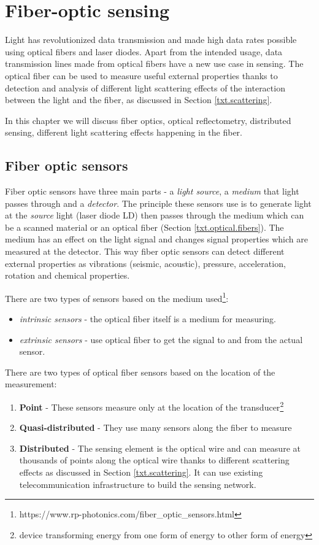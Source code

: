 \chapter{Fiber-optic sensing}\label{txt.sensing}

Light has revolutionized data transmission and made high data rates possible using optical fibers and laser diodes. Apart from the intended usage, data transmission lines made from optical fibers have a new use case in sensing. The optical fiber can be used to measure useful external properties thanks to detection and analysis of different light scattering effects of the interaction between the light and the fiber, as discussed in Section \ref{txt.scattering}.

In this chapter we will discuss fiber optics, optical reflectometry, distributed sensing, different light scattering effects happening in the fiber.




\section{Fiber optic sensors}

Fiber optic sensors have three main parts - a \textit{light source}, a \textit{medium} that light passes through and a \textit{detector}. The principle these sensors use is to generate light at the \textit{source} light (laser diode LD) then passes through the medium which can be a scanned material or an optical fiber (Section \ref{txt.optical.fibers}). The medium has an effect on the light signal and changes signal properties which are measured at the detector. This way fiber optic sensors can detect different external properties as vibrations (seismic, acoustic), pressure, acceleration, rotation and chemical properties.

There are two types of sensors based on the medium used\footnote{https://www.rp-photonics.com/fiber\_optic\_sensors.html}:
\begin{itemize}
    \item \textit{intrinsic sensors} - the optical fiber itself is a medium for measuring.
    \item \textit{extrinsic sensors} - use optical fiber to get the signal to and from the actual sensor.
\end{itemize}

There are two types of optical fiber sensors based on the location of the measurement:
\begin{enumerate}
    \item \textbf{Point} - These sensors measure only at the location of the transducer\footnote{device transforming energy from one form of energy to other form of energy}
    \item \textbf{Quasi-distributed} - They use many sensors along the fiber to measure 
    \item \textbf{Distributed} - The sensing element is the optical wire and can measure at thousands of points along the optical wire thanks to different scattering effects as discussed in Section \ref{txt.scattering}. It can use existing telecommunication infrastructure to build the sensing network.
\end{enumerate}

